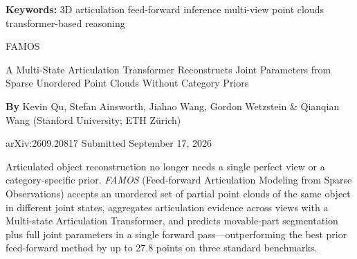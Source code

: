 \documentclass[10pt,twocolumn]{article}
\begin{document}
\setlength{\parindent}{0pt}
\setlength{\parskip}{4pt}

{\small\color{keywordgray}\textbf{Keywords:}
  3D articulation \textbullet{}
  feed-forward inference \textbullet{}
  multi-view point clouds \textbullet{}
  transformer-based reasoning}\par\vspace{4pt}

{\LARGE\bfseries\raggedright
  FAMOS}\par\vspace{4pt}

{\large\itshape\raggedright
  A Multi-State Articulation Transformer Reconstructs Joint Parameters from
  Sparse Unordered Point Clouds Without Category Priors}\par\vspace{6pt}

{\small\textbf{By} Kevin Qu, Stefan Ainsworth, Jiahao Wang, Gordon Wetzstein
  \& Qianqian Wang (Stanford University; ETH Z\"{u}rich)}\par\vspace{2pt}

{\small\color{keywordgray}arXiv:2609.20817 \textbullet{} Submitted September 17, 2026}
\par\vspace{2pt}\noindent{\color{rulered}\rule{\columnwidth}{0.6pt}}\vspace{6pt}

Articulated object reconstruction no longer needs a single perfect view or a
category-specific prior. \textit{FAMOS} (Feed-forward Articulation Modeling
from Sparse Observations) accepts an unordered set of partial point clouds of
the same object in different joint states, aggregates articulation evidence
across views with a Multi-state Articulation Transformer, and predicts
movable-part segmentation plus full joint parameters in a single forward
pass---outperforming the best prior feed-forward method by up to 27.8 points
on three standard benchmarks.
\end{document}
